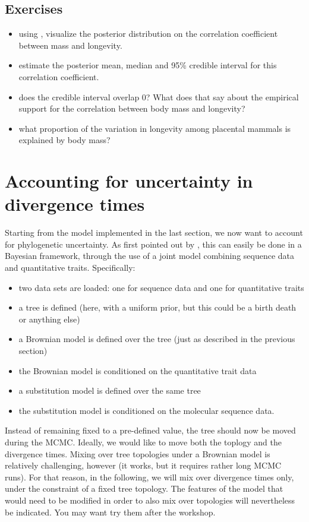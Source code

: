 \subsection*{Exercises}

\begin{itemize}
\item
using , visualize the posterior distribution on the correlation coefficient between mass and longevity.
\item
estimate the posterior mean, median and 95\% credible interval for this correlation coefficient.
\item
does the credible interval overlap 0? What does that say about the empirical support for the correlation between body mass and longevity?
\item
what proportion of the variation in longevity among placental mammals is explained by body mass?
\end{itemize}


\section{Accounting for uncertainty in divergence times}

Starting from the model implemented in the last section, we now want to account for phylogenetic uncertainty. As first pointed out by \cite{Huelsenbeck:2003p999}, this can easily be done in a Bayesian framework, through the use of a joint model combining sequence data and quantitative traits. Specifically:
\begin{itemize}
\item
two data sets are loaded: one for sequence data and one for quantitative traits
\item
a tree is defined (here, with a uniform prior, but this could be a birth death or anything else)
\item
a Brownian model is defined over the tree (just as described in the previous section)
\item
the Brownian model is conditioned on the quantitative trait data
\item
a substitution model is defined over the same tree
\item
the substitution model is conditioned on the molecular sequence data.
\end{itemize}
Instead of remaining fixed to a pre-defined value,
the tree should now be moved during the MCMC.
Ideally, we would like to move both the toplogy and the divergence times.
Mixing over tree topologies under a Brownian model is relatively challenging, however
(it works, but it requires rather long MCMC runs).
For that reason, in the following, we will mix over divergence times only,
under the constraint of a fixed tree topology.
The features of the model that would need to be modified in order to also mix over topologies
will nevertheless be indicated. You may want try them after the workshop.

